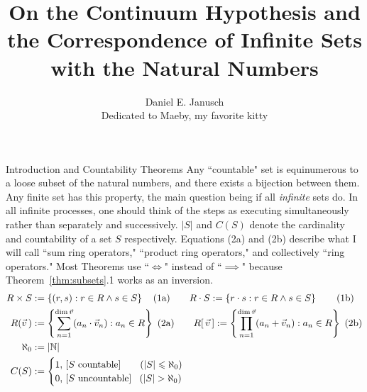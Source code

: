 \documentclass[12pt]{article}
\begin{document}
\title{On the Continuum Hypothesis and the Correspondence of Infinite Sets with the Natural Numbers}
\author{Daniel E. Janusch\\Dedicated to Maeby, my favorite kitty}
\maketitle

\begin{section}{Introduction and Countability Theorems}\label{sec:background}
	Any ``countable" set is equinumerous to a loose subset of the natural numbers, and
	there exists a bijection between them. Any finite set has this property, the main
	question being if all \emph{infinite} sets do. In all infinite processes, one should
	think of the steps as executing simultaneously rather than separately and successively.
	$|S|$ and $C(S)$ denote the cardinality and countability of a set $S$ respectively.
	Equations (2a) and (2b) describe what I will call ``sum ring operators," ``product
	ring operators," and collectively ``ring operators." Most Theorems use ``$\iff$"
	instead of ``$\implies$" because Theorem~\ref{thm:subsets}.1 works as an inversion.
	\vspace{-1em}\\
	\begin{align}
		R\times S & :=\{(r,s):r\in R\land s\in S\}~~~\,(1\text a)
		\hspace{2em}
		R\cdot S:=\{r\cdot s:r\in R\land s\in S\}~~~~~~\,(1\text b)
		\\
		R(\vec v\,) & :=\left\{\sum_{n=1}^{\dim\vec v}(a_n\cdot\vec v_n):a_n\in R\right\}~(2\text a)
		\hspace{2em}
		R[\,\vec v\,]:=\left\{\prod_{n=1}^{\dim\vec v}(a_n+\vec v_n):a_n\in R\right\}~(2\text b)\\
		\aleph_0 & := |\mathbb N|\\
		C(S) & :=\begin{cases}
			1,\,\left[S\text{ countable}\right]\phantom{un}~~(|S|\leqslant\aleph_0)\\
			0,\,\left[S\text{ uncountable}\right]~~(|S|>\aleph_0)\\
		\end{cases}
	\end{align}


\end{section}
\end{document}
